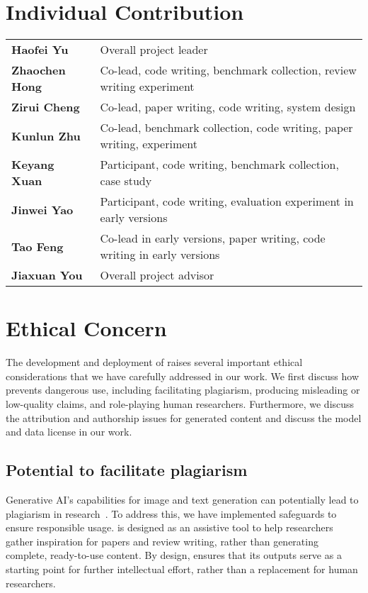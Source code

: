 \section{Individual Contribution}
\label{appendix:author-contribution}
\begin{tabular}{@{}ll@{}}
\textbf{Haofei Yu}     & Overall project leader \\
\textbf{Zhaochen Hong} & Co-lead, code writing, benchmark collection, review writing experiment \\
\textbf{Zirui Cheng}   & Co-lead, paper writing, code writing, system design \\
\textbf{Kunlun Zhu}    & Co-lead, benchmark collection, code writing, paper writing, experiment \\
\textbf{Keyang Xuan}   & Participant, code writing, benchmark collection, case study \\
\textbf{Jinwei Yao}    & Participant, code writing, evaluation experiment in early versions \\
\textbf{Tao Feng}      & Co-lead in early versions, paper writing, code writing in early versions \\
\textbf{Jiaxuan You}   & Overall project advisor \\
\end{tabular}


\section{Ethical Concern}
\label{appendix:ethical}

The development and deployment of \envname raises several important ethical considerations that we have carefully addressed in our work. We first discuss how \envname prevents dangerous use, including facilitating plagiarism, producing misleading or low-quality claims, and role-playing human researchers. Furthermore, we discuss the attribution and authorship issues for generated content and discuss the model and data license in our work.

\subsection{Potential to facilitate plagiarism}

Generative AI's capabilities for image and text generation can potentially lead to plagiarism in research~\citep{elali2023ai}. To address this, we have implemented safeguards to ensure responsible usage. \envname is designed as an assistive tool to help researchers gather inspiration for papers and review writing, rather than generating complete, ready-to-use content. By design, \envname ensures that its outputs serve as a starting point for further intellectual effort, rather than a replacement for human researchers. 

